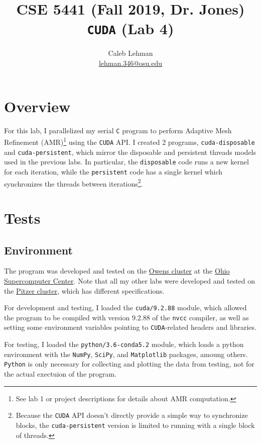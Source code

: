 \documentclass{article}
\title{\vspace{-2em}
CSE 5441 (Fall 2019, Dr. Jones)\\
\large \texttt{CUDA} (Lab 4)
}
\author{
Caleb Lehman \\
\href{mailto:lehman.346@osu.edu}{lehman.346@osu.edu}
}
\begin{document}
\maketitle

\section*{Overview}
\label{sec:overview}

For this lab, I parallelized my serial \texttt{C} program to perform Adaptive Mesh
Refinement (AMR)\footnote{See lab 1 or project descriptions for details about
AMR computation.} using the \texttt{CUDA} API. I created 2 programs,
\texttt{cuda-disposable} and \texttt{cuda-persistent}, which mirror the
disposable and persistent threads models used in the previous labs. In
particular, the \texttt{disposable} code runs a new kernel for each iteration,
while the \texttt{persistent} code has a single kernel which synchronizes the
threads between iterations\footnote{Because the \texttt{CUDA} API doesn't directly provide a simple way
to synchronize blocks, the \texttt{cuda-persistent} version is limited to running with a single block of
threads.}.

\section*{Tests}
\label{sec:tests}

\subsection*{Environment}
\label{subsec:environment}

The program was developed and tested on the
\href{https://www.osc.edu/resources/technical_support/supercomputers/owens}{Owens
cluster} at the \href{https://www.osc.edu/}{Ohio Supercomputer Center}.  Note
that all my other labs were developed and tested on the
\href{https://www.osc.edu/resources/technical_support/supercomputers/pitzer}{Pitzer
cluster}, which has different specifications.

For development and testing, I loaded the \texttt{cuda/9.2.88} module, which
allowed the program to be compiled with version 9.2.88 of the \texttt{nvcc}
compiler, as well as setting some environment variables pointing to
\texttt{CUDA}-related headers and libraries.

For testing, I loaded the \texttt{python/3.6-conda5.2} module, which loads a
python environment with the \texttt{NumPy}, \texttt{SciPy}, and
\texttt{Matplotlib} packages, amoung others. \texttt{Python} is only necessary
for collecting and plotting the data from testing, not for the actual exectuion
of the program.
\end{document}
